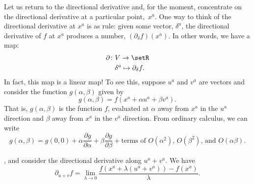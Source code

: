 \documentclass[10pt, a4paper]{article}
\begin{document}
Let us return to the directional derivative and, for the moment,
concentrate on the directional derivative at a particular
point,~$x^a$. One way to think of the directional derivative at $x^a$
is as rule: given some vector, $\delta^a$, the directional derivative of
$f$ at $x^a$ produces a number, $(\partial_\delta f)(x^a)$. In other words, we
have a map:
\begin{align*}
  \partial \colon & V \to \setR \\
           & \delta^a \mapsto \partial_\delta f.
\end{align*}
In fact, this map is a linear map! To see this, suppose $u^a$ and
$v^a$ are vectors and consider the function $g(\alpha,\beta)$ given by
\begin{equation*}
  g(\alpha,\beta) = f(x^a + \alpha u^a + \beta v^a).
\end{equation*}
That is, $g(\alpha,\beta)$ is the function $f$, evaluated at $\alpha$ away from $x^a$
in the $u^a$ direction and $\beta$ away from $x^a$ in the $v^a$
direction. From ordinary calculus, we can write
\begin{equation*}
  g(\alpha,\beta) = g(0,0) + \alpha\frac{\partial g}{\partial \alpha} + \beta\frac{\partial g}{\partial \beta} +
  \text{terms of $O(\alpha^2)$, $O(\beta^2)$, and $O(\alpha\beta)$}.
\end{equation*}




, and consider the directional derivative along
$u^a+v^a$. We have
\begin{equation*}
\partial_{u+v}f = \lim_{\lambda\to 0}\frac{f(x^a + \lambda(u^a+v^a)) - f(x^a)}{\lambda}. 
\end{equation*}
\end{document}
